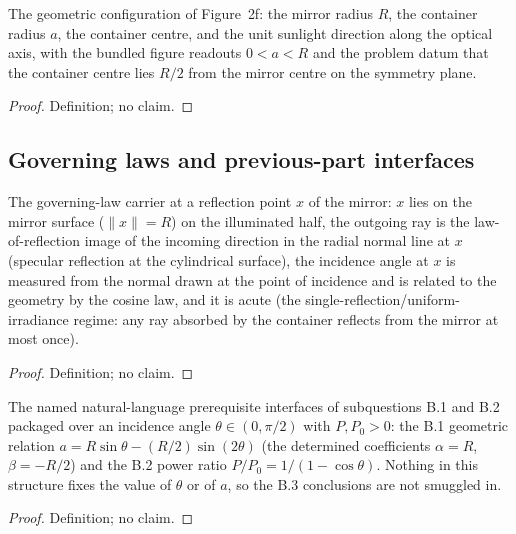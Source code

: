 \begin{definition}
\label{def:IPhO2026Problems_problem_IPhO_2026_2_B_3:SolarCookerGeometry}
The geometric configuration of Figure~2f: the mirror radius $R$, the
container radius $a$, the container centre, and the unit sunlight direction
along the optical axis, with the bundled figure readouts $0 < a < R$ and the
problem datum that the container centre lies $R/2$ from the mirror centre on
the symmetry plane.
\end{definition}
\begin{proof}
Definition; no claim.
\end{proof}

\subsection*{Governing laws and previous-part interfaces}

\begin{definition}
\label{def:IPhO2026Problems_problem_IPhO_2026_2_B_3:HalfCylindricalMirrorPhysics}
The governing-law carrier at a reflection point $x$ of the mirror: $x$ lies
on the mirror surface ($\|x\| = R$) on the illuminated half, the outgoing
ray is the law-of-reflection image of the incoming direction in the radial
normal line at $x$ (specular reflection at the cylindrical surface), the
incidence angle at $x$ is measured from the normal drawn at the point of
incidence and is related to the geometry by the cosine law, and it is acute
(the single-reflection/uniform-irradiance regime: any ray absorbed by the
container reflects from the mirror at most once).
\end{definition}
\begin{proof}
Definition; no claim.
\end{proof}

\begin{definition}
\label{def:IPhO2026Problems_problem_IPhO_2026_2_B_3:PreviousPartResults}
The named natural-language prerequisite interfaces of subquestions B.1 and
B.2 packaged over an incidence angle $\theta \in (0, \pi/2)$ with $P, P_0 > 0$:
the B.1 geometric relation
$a = R \sin\theta - (R/2)\sin(2\theta)$
(the determined coefficients $\alpha = R$, $\beta = -R/2$) and the B.2 power
ratio $P/P_0 = 1/(1 - \cos\theta)$.  Nothing in this structure fixes the
value of $\theta$ or of $a$, so the B.3 conclusions are not smuggled in.
\end{definition}
\begin{proof}
Definition; no claim.
\end{proof}

